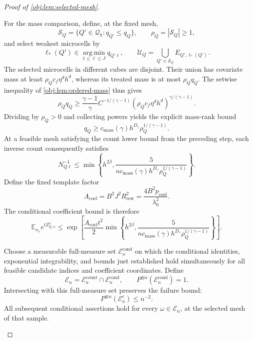 \begin{proof}[Proof of \cref{obj:lem:selected-mesh}]
\begin{enumerate}
For the mass comparison, define, at the fixed mesh,
\[
\mathcal S_Q=\{Q'\in\mathcal Q_h:q_{Q'}\le q_Q\},
\qquad
\rho_Q=|\mathcal S_Q|\ge1,
\]
and select weakest microcells by
\[
\ell_*(Q')\in
\operatorname*{arg\,min}_{1\le\ell\le J}q_{Q'\ell},
\qquad
\mathcal U_Q=\bigcup_{Q'\in\mathcal S_Q}E_{Q',\ell_*(Q')}.
\]
The selected microcells in different cubes are disjoint. Their union
has covariate mass at least \(\rho_Qc_f\eta^dh^d\), whereas its treated
mass is at most \(\rho_Qq_Q\). The setwise inequality of
\cref{obj:lem:ordered-mass} thus gives
\[
\rho_Qq_Q
\ge
\frac{\gamma-1}{\gamma}C^{-1/(\gamma-1)}
(\rho_Qc_f\eta^dh^d)^{\gamma/(\gamma-1)}.
\]
Dividing by \(\rho_Q>0\) and collecting powers yields the explicit
mass-rank bound
\[
q_Q\ge
c_{\mathrm{mass}}(\gamma)h^{D_\gamma}
\rho_Q^{1/(\gamma-1)}.
\]
At a feasible mesh satisfying the count lower bound from the preceding
step, each inverse count consequently satisfies
\[
N_{Q\ell}^{-1}
\le
\min\!\left\{
h^{2\beta},
\frac{5}{
n c_{\mathrm{mass}}(\gamma)h^{D_\gamma}
\rho_Q^{1/(\gamma-1)}}
\right\}.
\]
Define the fixed template factor
\[
A_{\mathrm{coef}}
=
B^2J^2R_{\mathrm{row}}^2
=
\frac{4B^2p_{\mathrm{coef}}}{\lambda_0^2}.
\]
The conditional coefficient bound is therefore
\[
\mathbb E_{\nu_\omega}e^{tZ_{Q,\alpha}^\omega}
\le
\exp\!\left[
\frac{A_{\mathrm{coef}}t^2}{2}
\min\!\left\{
h^{2\beta},
\frac{5}{
n c_{\mathrm{mass}}(\gamma)h^{D_\gamma}
\rho_Q^{1/(\gamma-1)}}
\right\}
\right].
\]

Choose a measurable full-measure set
\(\mathcal E_n^{\mathrm{cond}}\) on which the conditional identities,
exponential integrability, and bounds just established hold
simultaneously for all feasible candidate indices and coefficient
coordinates. Define
\[
\mathcal E_n
=
\mathcal E_n^{\mathrm{count}}\cap\mathcal E_n^{\mathrm{cond}},
\qquad
P^{\otimes n}(\mathcal E_n^{\mathrm{cond}})=1.
\]
Intersecting with this full-measure set preserves the failure bound:
\[
P^{\otimes n}(\mathcal E_n^c)\le n^{-2}.
\]
All subsequent conditional assertions hold for every \(\omega\in\mathcal
E_n\), at the selected mesh of that sample.


\end{enumerate}
\end{proof}

